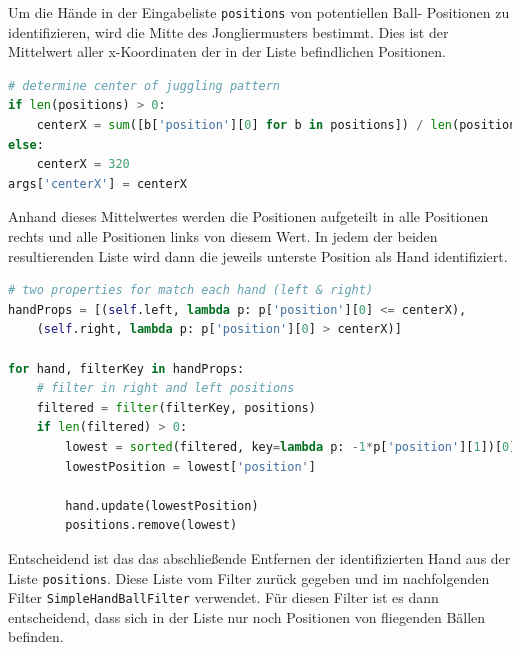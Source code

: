 \documentclass[12pt,a4paper,ngerman]{scrartcl}
\begin{document}
Um die Hände in der Eingabeliste \lstinline{positions} von potentiellen Ball-
Positionen zu identifizieren, wird
die Mitte des Jongliermusters bestimmt. Dies ist der Mittelwert aller x-Koordinaten
der in der Liste befindlichen Positionen. 

\begin{lstlisting}[language=Python,caption={\lstinline{HandTracking.py}, Ausschnitt}]
# determine center of juggling pattern
if len(positions) > 0:
    centerX = sum([b['position'][0] for b in positions]) / len(positions)
else:
    centerX = 320
args['centerX'] = centerX
\end{lstlisting}

Anhand dieses Mittelwertes werden die Positionen aufgeteilt in alle Positionen 
rechts und alle Positionen links von diesem Wert. In jedem der beiden resultierenden
Liste wird dann die jeweils unterste Position als Hand identifiziert.

\begin{lstlisting}[language=Python,caption={\lstinline{HandTracking.py}, Ausschnitt}]
# two properties for match each hand (left & right)
handProps = [(self.left, lambda p: p['position'][0] <= centerX),
    (self.right, lambda p: p['position'][0] > centerX)]

for hand, filterKey in handProps:
    # filter in right and left positions
    filtered = filter(filterKey, positions)
    if len(filtered) > 0:
        lowest = sorted(filtered, key=lambda p: -1*p['position'][1])[0]
        lowestPosition = lowest['position']

        hand.update(lowestPosition)
        positions.remove(lowest)
\end{lstlisting}

Entscheidend ist das das abschließende Entfernen der identifizierten Hand aus der 
Liste \lstinline{positions}. Diese Liste vom Filter zurück gegeben und im 
nachfolgenden Filter \lstinline{SimpleHandBallFilter} verwendet. Für diesen Filter
ist es dann entscheidend, dass sich in der Liste nur noch Positionen von fliegenden
Bällen befinden.
\end{document}
